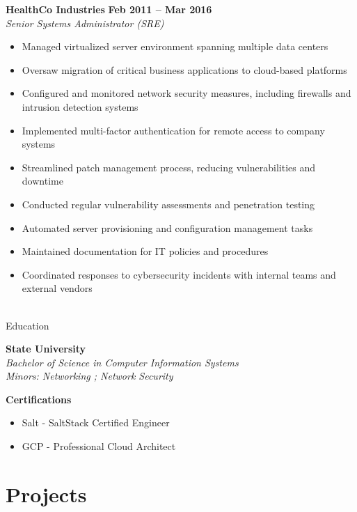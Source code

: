 \documentclass[10pt,a4paper]{article}
\newcommand{\cventry}[6]{
    \textbf{#1} \hfill \textbf{#2} \\
    \textit{#3} \\
    #4 \\
    #5
    \vspace{0.3em}
}
\begin{document}
    \cventry{HealthCo Industries}{Feb 2011 – Mar 2016}{\textit{Senior Systems Administrator (SRE)}}{
        \begin{itemize}
            \item Managed virtualized server environment spanning multiple data centers
            \item Oversaw migration of critical business applications to cloud-based platforms
            \item Configured and monitored network security measures, including firewalls and intrusion detection systems
            \item Implemented multi-factor authentication for remote access to company systems
            \item Streamlined patch management process, reducing vulnerabilities and downtime
            \item Conducted regular vulnerability assessments and penetration testing
            \item Automated server provisioning and configuration management tasks
            \item Maintained documentation for IT policies and procedures
            \item Coordinated responses to cybersecurity incidents with internal teams and external vendors
        \end{itemize}
    }{}

    \section{Education}

    \textbf{State University} \\
    \textit{Bachelor of Science in Computer Information Systems} \\
    \textit{Minors: Networking ; Network Security}

    \vspace{0.3em}

    \textbf{Certifications}
    \begin{itemize}
        \item Salt - SaltStack Certified Engineer
        \item GCP - Professional Cloud Architect
    \end{itemize}

    \section{Projects}
\end{document}
